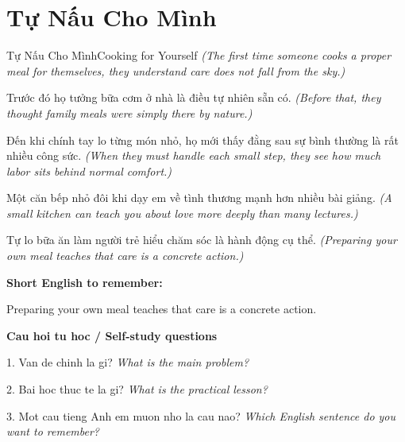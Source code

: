 \section{Tự Nấu Cho Mình}
\begin{truyen}{Tự Nấu Cho Mình}{Cooking for Yourself}
\textit{(The first time someone cooks a proper meal for themselves, they understand care does not fall from the sky.)}

Trước đó họ tưởng bữa cơm ở nhà là điều tự nhiên sẵn có.
\textit{(Before that, they thought family meals were simply there by nature.)}

Đến khi chính tay lo từng món nhỏ, họ mới thấy đằng sau sự bình thường là rất nhiều công sức.
\textit{(When they must handle each small step, they see how much labor sits behind normal comfort.)}

Một căn bếp nhỏ đôi khi dạy em về tình thương mạnh hơn nhiều bài giảng.
\textit{(A small kitchen can teach you about love more deeply than many lectures.)}

\end{truyen}

\begin{baihoc}
Tự lo bữa ăn làm người trẻ hiểu chăm sóc là hành động cụ thể.
\textit{(Preparing your own meal teaches that care is a concrete action.)}
\end{baihoc}

\begin{ghinhoanh}
\textbf{Short English to remember:}

Preparing your own meal teaches that care is a concrete action.

\end{ghinhoanh}

\begin{tuhocnhanh}
\textbf{Cau hoi tu hoc / Self-study questions}

1. Van de chinh la gi? \textit{What is the main problem?}

2. Bai hoc thuc te la gi? \textit{What is the practical lesson?}

3. Mot cau tieng Anh em muon nho la cau nao? \textit{Which English sentence do you want to remember?}
\end{tuhocnhanh}
\ngancach

